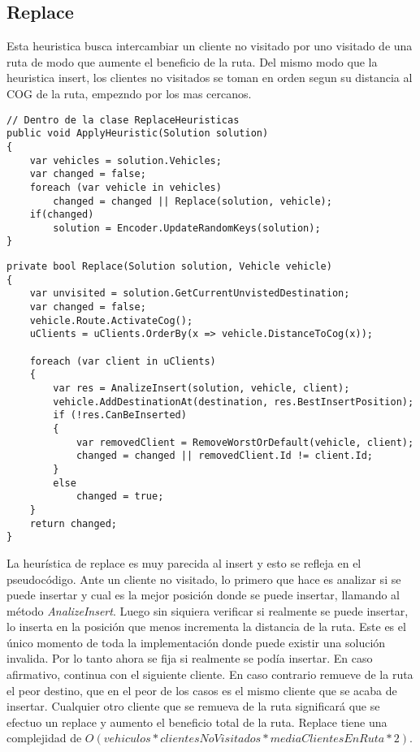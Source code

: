 \subsection{Replace}

Esta heuristica busca intercambiar un cliente no visitado por uno visitado de una ruta de modo que aumente el beneficio de la ruta. Del mismo modo que la heuristica insert, los clientes no visitados se toman en orden segun su distancia al COG de la ruta, empezndo por los mas cercanos.

\begin{minipage}{\textwidth}
\begin{lstlisting}
// Dentro de la clase ReplaceHeuristicas
public void ApplyHeuristic(Solution solution)
{	
	var vehicles = solution.Vehicles;
	var changed = false;	
	foreach (var vehicle in vehicles)
		changed = changed || Replace(solution, vehicle);
	if(changed)
		solution = Encoder.UpdateRandomKeys(solution);
}
\end{lstlisting}
\end{minipage}

\begin{minipage}{\textwidth}
\begin{lstlisting}
private bool Replace(Solution solution, Vehicle vehicle)
{
	var unvisited = solution.GetCurrentUnvistedDestination;
	var changed = false;
	vehicle.Route.ActivateCog();
	uClients = uClients.OrderBy(x => vehicle.DistanceToCog(x));	

	foreach (var client in uClients)
	{
		var res = AnalizeInsert(solution, vehicle, client);
		vehicle.AddDestinationAt(destination, res.BestInsertPosition);
		if (!res.CanBeInserted)
		{
			var removedClient = RemoveWorstOrDefault(vehicle, client);
			changed = changed || removedClient.Id != client.Id;
		}
		else
			changed = true;
	}
	return changed;
}
\end{lstlisting}
\end{minipage}

\bigskip

La heurística de replace es muy parecida al insert y esto se refleja en el pseudocódigo. Ante un cliente no visitado, lo primero que hace es analizar si se puede insertar y cual es la mejor posición donde se puede insertar, llamando al método \textit{AnalizeInsert}. Luego sin siquiera verificar si realmente se puede insertar, lo inserta en la posición que menos incrementa la distancia de la ruta. Este es el único momento de toda la implementación donde puede existir una solución invalida. Por lo tanto ahora se fija si realmente se podía insertar. En caso afirmativo, continua con el siguiente cliente. En caso contrario remueve de la ruta el peor destino, que en el peor de los casos es el mismo cliente que se acaba de insertar. Cualquier otro cliente que se remueva de la ruta significará que se efectuo un replace y aumento el beneficio total de la ruta. Replace tiene una complejidad de $O(vehiculos * clientesNoVisitados * mediaClientesEnRuta * 2)$. 

